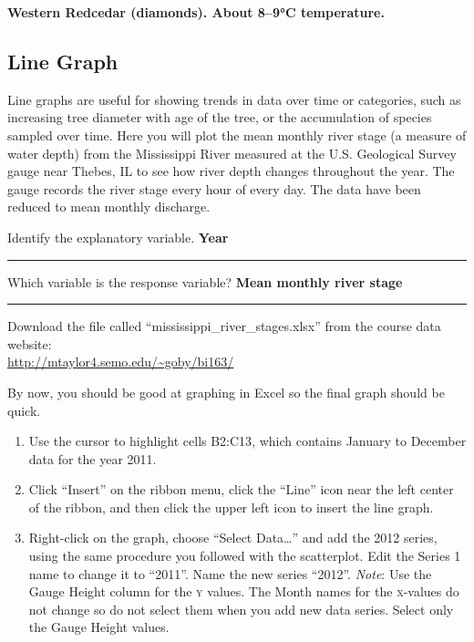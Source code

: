 \documentclass[12pt, hidelinks]{exam}
\newcommand*\AnswerBox[2]{%
	\parbox[t][#1]{0.92\textwidth}{%
		\begin{solution}#2\end{solution}
		\vskip\stretch{1}}
}
\begin{document}
\begin{questions}
\ifprintanswers \textbf{Western Redcedar (diamonds). About 8–9°C temperature.} \fi

\subsection*{Line Graph}

Line graphs are useful for showing trends in data over time or categories, such as increasing tree diameter with age of the tree, or the accumulation of species sampled over time. Here you will plot the mean monthly river stage (a measure of water depth) from the Mississippi River measured at the U.S. Geological Survey gauge near Thebes, IL to see how river depth changes throughout the year. The gauge records the river stage every hour of every day. The data have been reduced to mean monthly discharge. %

\smallskip

\question
Identify the explanatory variable. \ifprintanswers \textbf{Year} \else \rule{1.5in}{0.4pt} \fi


\medskip

\question
Which variable is the response variable? \ifprintanswers \textbf{Mean monthly river stage} \else \rule{1.5in}{0.4pt} \fi

\bigskip

Download the file called “mississippi\_river\_stages.xlsx” from the course data website:\\ \url{http://mtaylor4.semo.edu/~goby/bi163/}

By now, you should be good at graphing in Excel so the final graph should be quick.

\begin{enumerate}
	\item Use the cursor to highlight cells {\liningnum B2:C13}, which contains January to December data for the year 2011.

	\item Click “Insert” on the ribbon menu, click the “Line” icon near the left center of the ribbon, and then click the upper left icon to insert the line graph.

	\item Right-click on the graph, choose “Select Data\dots” and add the 2012 series, using the same procedure you followed with the scatterplot. Edit the Series 1 name to change it to “2011”. Name the new series “2012”. \emph{Note}: Use the Gauge Height column for the \textsc{y} values. The Month names for the \textsc{x}-values do not change so do not select them when you add new data series. Select only the Gauge Height values.


\end{enumerate}
\end{questions}
\end{document}
